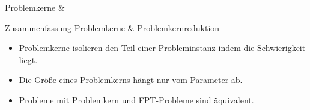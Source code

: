 \documentclass[navbaroff]{sdqbeamer}
\begin{document}
\begin{frame}[t]{Problemkerne \& \FPT}
\begin{overlayarea}{1\textwidth}{1\textheight}
{{                    
                }
        }
    \end{overlayarea}
\end{frame}

\begin{frame}{Zusammenfassung Problemkerne \& Problemkernreduktion}
    \begin{itemize}
        \item Problemkerne isolieren den Teil einer Probleminstanz indem die Schwierigkeit liegt.
        \item Die Größe eines Problemkerns hängt nur vom Parameter ab.
        \item Probleme mit Problemkern und FPT-Probleme sind äquivalent.
    \end{itemize}

\end{frame}
\end{document}
